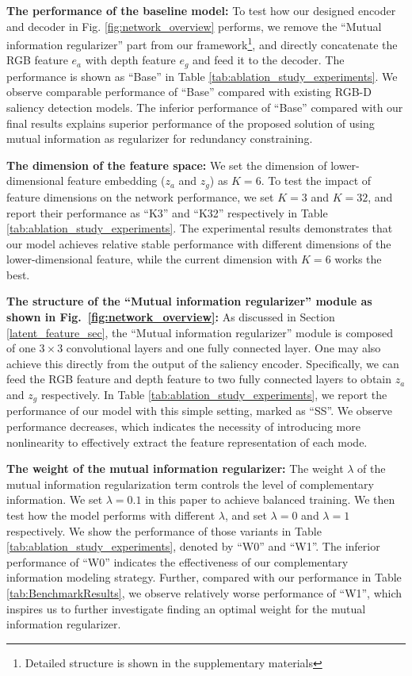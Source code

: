 \documentclass[10pt,twocolumn,letterpaper]{article}
\begin{document}
\noindent\textbf{The performance of the baseline model:} To test how our designed encoder and decoder in Fig. \ref{fig:network_overview} performs, we remove the \enquote{Mutual information regularizer} part from our framework\footnote{Detailed structure is shown in the supplementary materials}, and directly concatenate the RGB feature $e_a$ with depth feature $e_g$ and feed it to the decoder. The performance is shown as \enquote{Base} in Table \ref{tab:ablation_study_experiments}. We observe comparable performance of \enquote{Base} compared with existing RGB-D saliency detection models. The inferior performance of \enquote{Base} compared with our final results explains superior performance of the proposed solution of using mutual information as regularizer for redundancy constraining.

\noindent\textbf{The dimension of the feature space:} We set the dimension of lower-dimensional feature embedding ($z_a$ and $z_g$) as $K=6$. To test the impact of feature dimensions on the network performance, we set $K=3$ and $K=32$, and report their performance as \enquote{K3} and \enquote{K32} respectively in Table \ref{tab:ablation_study_experiments}. The experimental results demonstrates that our model achieves relative stable performance with different dimensions of the lower-dimensional feature, while the current dimension with $K=6$ works the best.




\noindent\textbf{The structure of the \enquote{Mutual information regularizer} module as shown in Fig.~\ref{fig:network_overview}:} As discussed in Section \ref{latent_feature_sec}, the \enquote{Mutual information regularizer} module is composed of one $3\times3$ convolutional layers
and one fully connected layer. One may also achieve this directly from the output of the saliency encoder. Specifically, we can feed the RGB feature and depth feature to two fully connected layers to obtain $z_a$ and $z_g$ respectively. 
In Table \ref{tab:ablation_study_experiments}, we report the performance of our model with this simple setting, marked as \enquote{SS}. 
We observe
performance decreases, which indicates the
necessity of introducing more nonlinearity to effectively extract the feature representation of each mode.




\noindent\textbf{The weight of the mutual information regularizer:} The weight $\lambda$ of the mutual information regularization term controls the level of complementary information. We set $\lambda=0.1$ in this paper to achieve balanced training. We then test how the model performs with different
$\lambda$, and set $\lambda=0$ and $\lambda=1$ respectively. We show the performance of those variants in Table \ref{tab:ablation_study_experiments}, denoted by \enquote{W0} and \enquote{W1}. The inferior performance of \enquote{W0} indicates the effectiveness of our complementary information modeling strategy. Further, compared with our performance in Table \ref{tab:BenchmarkResults}, we observe relatively worse performance of \enquote{W1}, which inspires us to further investigate finding an optimal weight for the mutual information regularizer.
\end{document}
